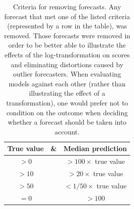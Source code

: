 \documentclass{article}
\providecommand{\DIFaddend}{} %
\DeclareRobustCommand{\DIFaddend}{\DIFOaddend \let\includegraphics\DIFOincludegraphics} %
\begin{document}
\DIFaddend \begin{table}
\centering
\begin{tabular}{ccc}
\toprule
True value & \& & Median prediction\\
\midrule
$>0$ & \ & $>100\times$ true value\\
$>10$ & \  & $>20\times$ true value\\
$>50$ & \  & $<1/50\times$ true value\\
$= 0$ & \  & $>100$\\
\bottomrule
\end{tabular}
\caption{Criteria for removing forecasts. Any forecast that met one of the listed criteria (represented by a row in the table), was removed. Those forecasts were removed in order to be better able to illustrate the effects of the log-transformation on scores and eliminating distortions caused by outlier forecasters. When evaluating models against each other (rather than illustrating the effect of a transformation), one would prefer not to condition on the outcome when deciding whether a forecast should be taken into account. }
\label{tab:erroneous}
\end{table}
\end{document}
